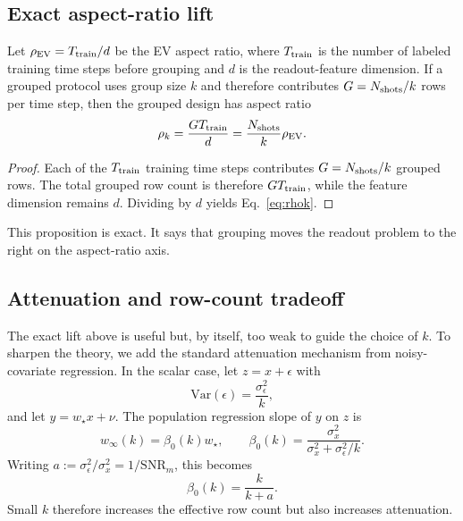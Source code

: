 \subsection{Exact aspect-ratio lift}

\begin{proposition}
Let $\rho_{\mathrm{EV}}=T_{\mathrm{train}}/d$ be the EV aspect ratio, where $T_{\mathrm{train}}$ is the number of labeled training time steps before grouping and $d$ is the readout-feature dimension. If a grouped protocol uses group size $k$ and therefore contributes $G=N_{\mathrm{shots}}/k$ rows per time step, then the grouped design has aspect ratio
\begin{equation}
\rho_k = \frac{GT_{\mathrm{train}}}{d} = \frac{N_{\mathrm{shots}}}{k}\rho_{\mathrm{EV}}.
\label{eq:rhok}
\end{equation}
\end{proposition}

\begin{proof}
Each of the $T_{\mathrm{train}}$ training time steps contributes $G=N_{\mathrm{shots}}/k$ grouped rows. The total grouped row count is therefore $GT_{\mathrm{train}}$, while the feature dimension remains $d$. Dividing by $d$ yields Eq.~\eqref{eq:rhok}.
\end{proof}

This proposition is exact. It says that grouping moves the readout problem to the right on the aspect-ratio axis.

\subsection{Attenuation and row-count tradeoff}

The exact lift above is useful but, by itself, too weak to guide the choice of $k$. To sharpen the theory, we add the standard attenuation mechanism from noisy-covariate regression. In the scalar case, let $z=x+\epsilon$ with
\begin{equation}
\mathrm{Var}(\epsilon)=\frac{\sigma_\epsilon^2}{k},
\end{equation}
and let $y=w_\star x+\nu$. The population regression slope of $y$ on $z$ is
\begin{equation}
w_\infty(k)=\beta_0(k)w_\star,
\qquad
\beta_0(k)=\frac{\sigma_x^2}{\sigma_x^2+\sigma_\epsilon^2/k}.
\label{eq:beta0}
\end{equation}
Writing $a:=\sigma_\epsilon^2/\sigma_x^2=1/\mathrm{SNR}_m$, this becomes
\begin{equation}
\beta_0(k)=\frac{k}{k+a}.
\label{eq:beta0a}
\end{equation}
Small $k$ therefore increases the effective row count but also increases attenuation.

